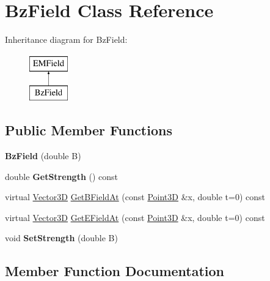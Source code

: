 \hypertarget{classBzField}{}\section{Bz\+Field Class Reference}
\label{classBzField}
Inheritance diagram for Bz\+Field\+:\begin{figure}[H]
\begin{center}
\leavevmode
\includegraphics[height=2.000000cm]{classBzField}
\end{center}
\end{figure}
\subsection*{Public Member Functions}
\begin{DoxyCompactItemize}
\item 
\mbox{\label{classBzField_a0d34ffdce32cfd2323417a73082de638}} 
{\bfseries Bz\+Field} (double B)
\item 
\mbox{\label{classBzField_a5469af2716fcda0e6111410413fe5cde}} 
double {\bfseries Get\+Strength} () const
\item 
virtual \hyperlink{classTVec3D}{Vector3D} \hyperlink{classBzField_a9903383be440aa99b504f5585ddd65f9}{Get\+B\+Field\+At} (const \hyperlink{classTVec3D}{Point3D} \&x, double t=0) const
\item 
virtual \hyperlink{classTVec3D}{Vector3D} \hyperlink{classBzField_a05df21f7fec6b866936b6c8c70883bf0}{Get\+E\+Field\+At} (const \hyperlink{classTVec3D}{Point3D} \&x, double t=0) const
\item 
\mbox{\label{classBzField_a585e0732eb58207e6d1e6f0d1c680921}} 
void {\bfseries Set\+Strength} (double B)
\end{DoxyCompactItemize}


\subsection{Member Function Documentation}
\mbox{\label{classBzField_a9903383be440aa99b504f5585ddd65f9}} 
